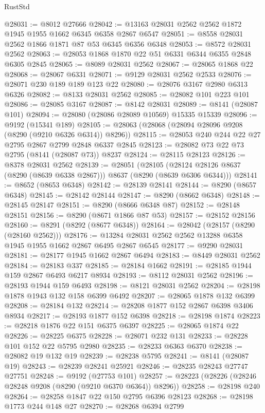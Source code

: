 \begin{lexlean}{RustStd}
\begin{coremodule}
@28031 := @8012 @27666
@28042 := @13163 @28031 @2562 @2562 @1872 @1945 @1955 @1662 @6345 @6358 @2867 @6547
@28051 := @8558 @28031 @2562 @1866 @1871 @87 @53 @6345 @6356 @6348
@28053 := @8572 @28031 @2562
@28063 := @28053 @1868 @1870 @22 @51 @6331 @6344 @6355 @2848 @6305 @2845
@28065 := @8089 @28031 @2562
@28067 := @28065 @1868 @22
@28068 := @28067 @6331
@28071 := @9129 @28031 @2562 @2533
@28076 := @28071 @230 @189 @189 @123 @22
@28080 := @28076 @3167 @2980 @6313 @6326
@28082 := @8133 @28031 @2562
@28085 := @28082 @101 @223 @101
@28086 := @28085 @3167
@28087 := @8142 @28031
@28089 := @8141 (@28087 @101)
@28094 := @28080 (@28086 @28089 @10569) @15335 @15339
@28096 := @9192 (@15341 @189)
@28105 := @28063 (@28068 (@28094 @28096 @9208 (@8290 (@9210 @6326 @6314)) @8296))
@28115 := @28053 @240 @244 @22 @27 @2795 @2867 @2799 @2848 @6337 @2845
@28123 := @28082 @73 @22 @73 @2795 (@8141 (@28087 @73)) @8237
@28124 := @28115 @28123
@28126 := @8378 @28031 @2562
@28139 := @28051
    (@28105 (@28124 @28126 @8637 (@8290 (@8639 @6338 @2867))) @8637 (@8290 (@8639 @6306 @6344)))
@28141 := @8652 (@8653 @6348)
@28142 := @28139 @28141
@28144 := @8290 (@8657 @6348)
@28145 := @28142 @28144
@28147 := @8290 (@8662 @6348)
@28148 := @28145 @28147
@28151 := @8290 (@8666 @6348 @87)
@28152 := @28148 @28151
@28156 := @8290 (@8671 @1866 @87 @53)
@28157 := @28152 @28156
@28160 := @8291 (@8292 (@8677 @6348))
@28164 := @28042 (@28157 (@8290 (@28160 @2562)))
@28176 := @13284 @28031 @2562 @2562 @13288 @6358 @1945 @1955 @1662 @2867 @6495 @2867 @6545
@28177 := @9290 @28031
@28181 := @28177 @1945 @1662 @2867 @6494
@28183 := @8449 @28031 @2562
@28184 := @28183 @337
@28185 := @28184 @1662
@28191 := @28185 @1944 @159 @2867 @6493 @6217 @8934
@28193 := @8112 @28031 @2562
@28196 := @28193 @1944 @159 @6493
@28198 := @8121 @28031 @2562
@28204 := @28198 @1878 @1943 @132 @158 @6399 @6492
@28207 := @28065 @1878 @132 @6399
@28208 := @28184 @132
@28214 := @28208 @1877 @152 @2867 @6398 @3406 @8934
@28217 := @28193 @1877 @152 @6398
@28218 := @28198 @1874
@28223 := @28218 @1876 @22 @151 @6375 @6397
@28225 := @28065 @1874 @22
@28226 := @28225 @6375
@28228 := @28071 @232 @131
@28233 := @28228 @101 @152 @22 @5795 @2980
@28235 := @28233 @6363 @6370
@28238 := @28082 @19 @132 @19
@28239 := @28238 @5795
@28241 := @8141 (@28087 @19)
@28243 := @28239 @28241 @25921
@28246 := @28235 @28243 @27747 @27751
@28248 := @9192 (@27753 @101)
@28257 := @28223 (@28226 (@28246 @28248 @9208 (@8290 (@9210 @6370 @6364)) @8296))
@28258 := @28198 @240
@28264 := @28258 @1847 @22 @150 @2795 @6396 @28123
@28268 := @28198 @1773 @244 @148 @27
@28270 := @28268 @6394 @2799

\end{coremodule}
\end{lexlean}
